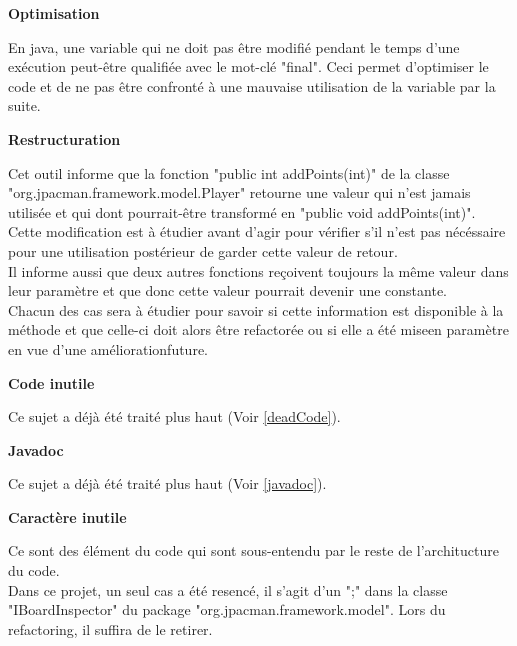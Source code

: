 \documentclass[12pt,a4paper,final]{article}
\newcommand{\smalltitle}[1]{\bigskip\large\textbf{#1}\par\normalsize\medskip}
\begin{document}
\smalltitle{Optimisation}
En java, une variable qui ne doit pas être modifié pendant le temps d'une exécution peut-être qualifiée avec le mot-clé "final". Ceci permet d'optimiser le code et de ne pas être confronté à une mauvaise utilisation de la variable par la suite.


\smalltitle{Restructuration}
Cet outil informe que la fonction "public int addPoints(int)" de la classe "org.jpacman.framework.model.Player" retourne une valeur qui n'est jamais utilisée et qui dont pourrait-être transformé en "public void addPoints(int)".\\
Cette modification est à étudier avant d'agir pour vérifier s'il n'est pas nécéssaire pour une utilisation postérieur de garder cette valeur de retour.\\
Il informe aussi que deux autres fonctions reçoivent toujours la même valeur dans leur paramètre et que donc cette valeur pourrait devenir une constante.\\
Chacun des cas sera à étudier pour savoir si cette information est disponible à la méthode et que celle-ci doit alors être refactorée ou si elle a été miseen paramètre en vue d'une améliorationfuture.

\smalltitle{Code inutile}
Ce sujet a déjà été traité plus haut (Voir \ref{deadCode}).


\smalltitle{Javadoc}
Ce sujet a déjà été traité plus haut (Voir \ref{javadoc}).


\smalltitle{Caractère inutile}
Ce sont des élément du code qui sont sous-entendu par le reste de l'architucture du code.\\
Dans ce projet, un seul cas a été resencé, il s'agit d'un ";" dans la classe "IBoardInspector" du package "org.jpacman.framework.model". Lors du refactoring, il suffira de le retirer.
\end{document}
